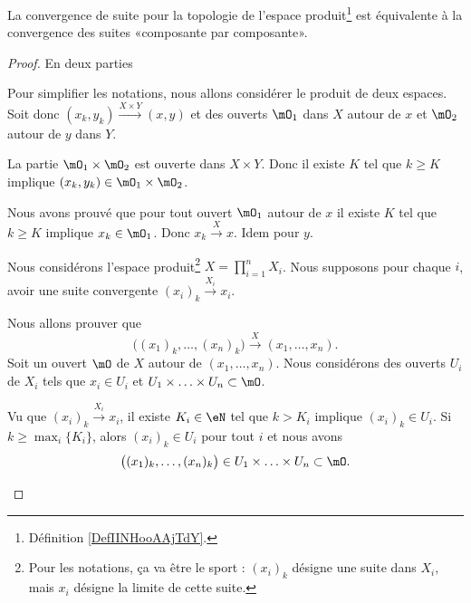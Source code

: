 \begin{proposition}      \label{PROPooNRRIooCPesgO}
	La convergence de suite pour la topologie de l'espace produit\footnote{Définition \ref{DefIINHooAAjTdY}.} est équivalente à la convergence des suites «composante par composante».
\end{proposition}

\begin{proof}
	En deux parties
	\begin{subproof}
		Pour simplifier les notations, nous allons considérer le produit de deux espaces. Soit donc \( (x_k,y_k)\stackrel{X\times Y}{\longrightarrow}(x,y)\) et des ouverts \( \mO_1\) dans \( X\) autour de \( x\) et \( \mO_2\) autour de \( y\) dans \( Y\).

		La partie \( \mO_1\times \mO_2\) est ouverte dans \( X\times Y\). Donc il existe \( K\) tel que \( k\geq K\) implique \( (x_k,y_k)\in \mO_1\times \mO_2\).

		Nous avons prouvé que pour tout ouvert \( \mO_1\) autour de \( x\) il existe \( K\) tel que \( k\geq K\) implique \( x_k\in \mO_1\). Donc \( x_k\stackrel{X}{\longrightarrow}x\). Idem pour \( y\).

		Nous considérons l'espace produit\footnote{Pour les notations, ça va être le sport : \( (x_i)_k\) désigne une suite dans \( X_i\), mais \( x_i\) désigne la limite de cette suite.} \( X=\prod_{i=1}^nX_i\). Nous supposons pour chaque \( i\), avoir une suite convergente \( (x_i)_k\stackrel{X_i}{\longrightarrow}x_i\).

		Nous allons prouver que
		\begin{equation}
			\big( (x_1)_k,\ldots, (x_n)_k \big)\stackrel{X}{\longrightarrow}(x_1,\ldots, x_n).
		\end{equation}
		Soit un ouvert \( \mO\) de \( X\) autour de \( (x_1,\ldots, x_n)\). Nous considérons des ouverts \( U_i\) de \( X_i\) tels que \( x_i\in U_i\) et \( U_1\times\ldots\times U_n\subset\mO\).

		Vu que \( (x_i)_k\stackrel{X_i}{\longrightarrow}x_i\), il existe \( K_i\in \eN\) tel que \( k>K_i\) implique \( (x_i)_k\in U_i\). Si \( k\geq \max_i\{ K_i \}\), alors \( (x_i)_k\in U_i\) pour tout \( i\) et nous avons
		\begin{equation}
			\big( (x_1)_k,\ldots,(x_n)_k \big)\in U_1\times\ldots\times U_n\subset \mO.
		\end{equation}
	\end{subproof}
\end{proof}

